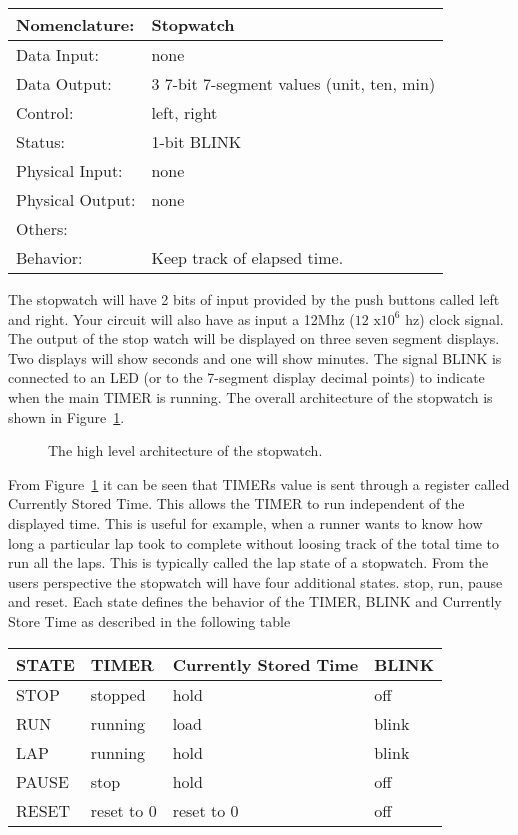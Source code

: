 \begin{enumerate}
\begin{tabular}{|l|p{3.5in}|} \hline
Nomenclature:  & Stopwatch         \\ \hline
Data Input:    & none         \\ \hline
Data Output:   & 3 7-bit 7-segment values (unit, ten, min)   \\ \hline
Control:       & left, right           \\ \hline
Status:        & 1-bit BLINK                         \\ \hline
Physical Input:& none        \\ \hline
Physical Output:& none          \\ \hline
Others:        &            \\ \hline
Behavior:      & Keep track of elapsed time. \\ \hline
\end{tabular}

The stopwatch will have 2 bits of input provided by the
push buttons called left and right.  Your circuit will also have as 
input a 12Mhz ($12\text{ x}10^6$ hz) clock signal.   The output of the stop 
watch will be displayed on three seven segment displays.  Two 
displays will show seconds and one will show minutes.   The signal
BLINK is connected to an LED (or to the 7-segment display decimal points)
to indicate when the main TIMER is running.  The overall
architecture of the stopwatch is shown in Figure~\ref{fig:stopwatch_dp}.

\begin{figure}[ht]
\caption{The high level architecture of the stopwatch.}
\label{fig:stopwatch_dp}
\end{figure}

From Figure~\ref{fig:stopwatch_dp} it can be seen that TIMERs
value is sent through a register called Currently Stored Time.
This allows the TIMER to run independent of the displayed time.
This is useful for example, when a runner wants to know how long 
a particular lap took to complete without loosing track of the 
total time to run all the laps.
This is typically called the lap state of a stopwatch.  From the 
users perspective the stopwatch will have four additional
states.  stop, run,  pause and reset.  Each state defines the
behavior of the TIMER, BLINK and Currently Store Time as described
in the following table

\begin{tabular}{l||l|l|l}
STATE	&	TIMER	& Currently Stored Time	& BLINK	\\ \hline \hline
STOP	&	stopped	&	hold		& off	\\ \hline
RUN	&	running	&	load		& blink	\\ \hline
LAP	&	running &	hold		& blink	\\ \hline
PAUSE	& 	stop	& 	hold		& off	\\ \hline
RESET	& reset to 0	& reset to 0		& off	\\ 
\end{tabular}


\end{enumerate}
